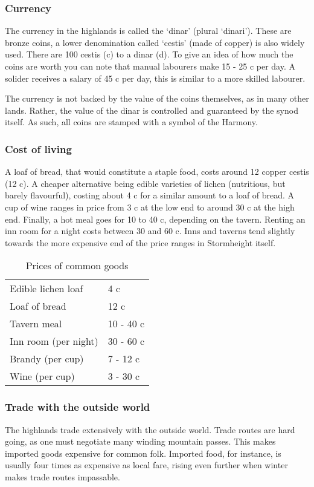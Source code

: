 \documentclass[a4paper,11pt,oneside]{book}
\begin{document}
\subsubsection{Currency}
The currency in the highlands is called the `dinar' (plural `dinari'). These are bronze coins, a lower denomination called `cestis' (made of copper) is also widely used. There are 100 cestis (c) to a dinar (d). To give an idea of how much the coins are worth you can note that manual labourers make 15 - 25 c per day. A solider receives a salary of 45 c per day, this is similar to a more skilled labourer. 

The currency is not backed by the value of the coins themselves, as in many other lands. Rather, the value of the dinar is controlled and guaranteed by the synod itself. As such, all coins are stamped with a symbol of the Harmony. 

\subsubsection{Cost of living}
A loaf of bread, that would constitute a staple food, costs around 12 copper cestis (12 c). A cheaper alternative being edible varieties of lichen (nutritious, but barely flavourful), costing about 4 c for a similar amount to a loaf of bread. A cup of wine ranges in price from 3 c at the low end to around 30 c at the high end. Finally, a hot meal goes for 10 to 40 c, depending on the tavern. Renting an inn room for a night costs between 30 and 60 c. Inns and taverns tend slightly towards the more expensive end of the price ranges in Stormheight itself.  

\begin{table}[ht!]
	\centering
	\begin{tabular}{|l|l|}
		\hline
		Edible lichen loaf & 4 c\\ 
		Loaf of bread & 12 c \\
		Tavern meal & 10 - 40 c \\
		Inn room (per night) & 30 - 60 c \\
		Brandy (per cup) & 7 - 12 c \\
		Wine (per cup) & 3 - 30 c \\
		\hline		
	\end{tabular}
\caption{Prices of common goods}
\end{table}

\subsubsection{Trade with the outside world}
The highlands trade extensively with the outside world. Trade routes are hard going, as one must negotiate many winding mountain passes. This makes imported goods expensive for common folk. Imported food, for instance, is usually four times as expensive as local fare, rising even further when winter makes trade routes impassable. 
\end{document}
